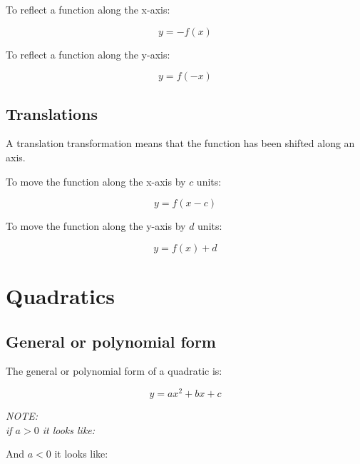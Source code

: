 \documentclass{book}
\newenvironment{note}{\begin{center}\em NOTE:\\}{\end{center}}
\begin{document}
To reflect a function along the x-axis:

\[
	y = -f(x)
\]

To reflect a function along the y-axis:

\[
	y = f(-x)
\]



\section{Translations}
A translation transformation means that the function has been shifted along an axis.

To move the function along the x-axis by $c$ units:

\[
	y = f(x - c)
\]

To move the function along the y-axis by $d$ units:

\[
	y = f(x) + d
\]




\chapter{Quadratics}
\section{General or polynomial form}
The general or polynomial form of a quadratic is:

\[
	y = ax^2 + bx + c
\]

\begin{note}
	if $a > 0$ it looks like:
	\begin{center}
	\end{center}
	And $a < 0$ it looks like:
	\begin{center}
	\end{center}
\end{note}
\end{document}
